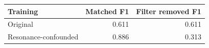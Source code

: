 \begin{tabular}{lrr}
\toprule
Training & Matched F1 & Filter removed F1 \\
\midrule
Original & 0.611 & 0.611 \\
Resonance-confounded & 0.886 & 0.313 \\
\bottomrule
\end{tabular}
